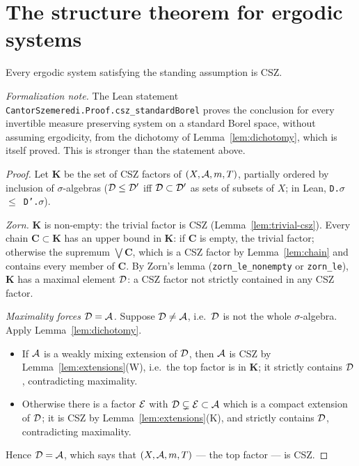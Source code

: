 \section{The structure theorem for ergodic systems}

\begin{theorem}
  \label{thm:ecsz}
  \leanok
  Every ergodic system satisfying the standing assumption is CSZ.
\end{theorem}
\emph{Formalization note.}  The Lean statement \texttt{CantorSzemeredi.Proof.csz\_standardBorel}
proves the conclusion for every invertible measure preserving system on a standard Borel space,
without assuming ergodicity, from the dichotomy of Lemma~\ref{lem:dichotomy}, which is itself
proved.  This is stronger than the statement above.


\begin{proof}
  Let $\mathbf K$ be the set of CSZ factors of $(X,\mathcal{A},m,T)$, partially ordered by inclusion
  of $\sigma$-algebras ($\mathcal{D} \leq \mathcal{D}'$ iff $\mathcal{D} \subset \mathcal{D}'$ as sets of subsets of $X$;
  in Lean, \texttt{D.\ensuremath{\sigma} \ensuremath{\leq} D'.\ensuremath{\sigma}}).

  \emph{Zorn.}  $\mathbf K$ is non-empty: the trivial factor is CSZ (Lemma~\ref{lem:trivial-csz}).
  Every chain $\mathbf C \subset \mathbf K$ has an upper bound in $\mathbf K$: if $\mathbf C$
  is empty, the trivial factor; otherwise the supremum $\bigvee \mathbf C$, which is a CSZ factor
  by Lemma~\ref{lem:chain} and contains every member of $\mathbf C$.  By Zorn's lemma
  (\texttt{zorn\_le\_nonempty} or \texttt{zorn\_le}), $\mathbf K$ has a maximal element $\mathcal{D}$:
  a CSZ factor not strictly contained in any CSZ factor.

  \emph{Maximality forces $\mathcal{D} = \mathcal{A}$.}  Suppose $\mathcal{D} \neq \mathcal{A}$, i.e.\ $\mathcal{D}$ is not the
  whole $\sigma$-algebra.  Apply Lemma~\ref{lem:dichotomy}.
  \begin{itemize}
    \item If $\mathcal{A}$ is a weakly mixing extension of $\mathcal{D}$, then $\mathcal{A}$ is CSZ by
      Lemma~\ref{lem:extensions}(W), i.e.\ the top factor is in $\mathbf K$; it strictly
      contains $\mathcal{D}$, contradicting maximality.
    \item Otherwise there is a factor $\mathcal{E}$ with $\mathcal{D} \subsetneq \mathcal{E} \subset \mathcal{A}$ which is a
      compact extension of $\mathcal{D}$; it is CSZ by Lemma~\ref{lem:extensions}(K), and strictly
      contains $\mathcal{D}$, contradicting maximality.
  \end{itemize}
  Hence $\mathcal{D} = \mathcal{A}$, which says that $(X,\mathcal{A},m,T)$ --- the top factor --- is CSZ.
\end{proof}

